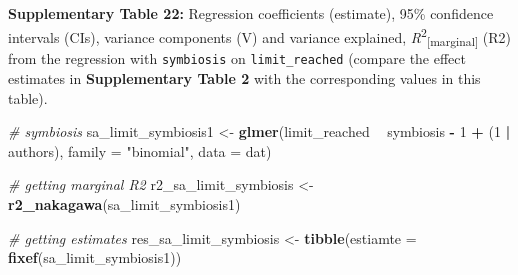 \documentclass[
]{article}
\newenvironment{Shaded}{\begin{snugshade}}{\end{snugshade}}
\newcommand{\CommentTok}[1]{\textcolor[rgb]{0.56,0.35,0.01}{\textit{#1}}}
\newcommand{\DataTypeTok}[1]{\textcolor[rgb]{0.13,0.29,0.53}{#1}}
\newcommand{\DecValTok}[1]{\textcolor[rgb]{0.00,0.00,0.81}{#1}}
\newcommand{\KeywordTok}[1]{\textcolor[rgb]{0.13,0.29,0.53}{\textbf{#1}}}
\newcommand{\NormalTok}[1]{#1}
\newcommand{\OperatorTok}[1]{\textcolor[rgb]{0.81,0.36,0.00}{\textbf{#1}}}
\newcommand{\StringTok}[1]{\textcolor[rgb]{0.31,0.60,0.02}{#1}}
\begin{document}
\textbf{Supplementary Table 22:} Regression coefficients (estimate),
95\% confidence intervals (CIs), variance components (V) and variance
explained, \emph{R}\textsuperscript{2}\textsubscript{{[}marginal{]}}
(R2) from the regression with \texttt{symbiosis} on
\texttt{limit\_reached} (compare the effect estimates in
\textbf{Supplementary Table 2} with the corresponding values in this
table).

\begin{Shaded}
\begin{Highlighting}[]
\CommentTok{# symbiosis}
\NormalTok{sa_limit_symbiosis1 <-}\StringTok{ }\KeywordTok{glmer}\NormalTok{(limit_reached }\OperatorTok{~}\StringTok{ }\NormalTok{symbiosis }\OperatorTok{-}\StringTok{ }\DecValTok{1} \OperatorTok{+}\StringTok{ }\NormalTok{(}\DecValTok{1} \OperatorTok{|}\StringTok{ }\NormalTok{authors), }\DataTypeTok{family =} \StringTok{"binomial"}\NormalTok{, }
    \DataTypeTok{data =}\NormalTok{ dat)}

\CommentTok{# getting marginal R2}
\NormalTok{r2_sa_limit_symbiosis <-}\StringTok{ }\KeywordTok{r2_nakagawa}\NormalTok{(sa_limit_symbiosis1)}

\CommentTok{# getting estimates}
\NormalTok{res_sa_limit_symbiosis <-}\StringTok{ }\KeywordTok{tibble}\NormalTok{(}\DataTypeTok{estiamte =} \KeywordTok{fixef}\NormalTok{(sa_limit_symbiosis1))}


\end{Highlighting}
\end{Shaded}
\end{document}
